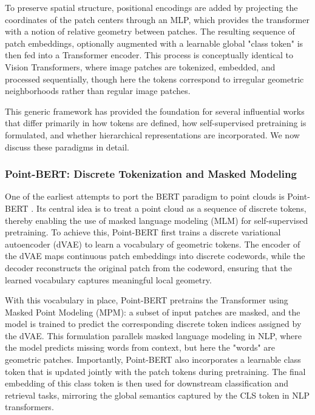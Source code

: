 To preserve spatial structure, positional encodings are added by projecting the coordinates of the patch centers through an MLP, which provides the transformer with a notion of relative geometry between patches. The resulting sequence of patch embeddings, optionally augmented with a learnable global "class token" is then fed into a Transformer encoder. This process is conceptually identical to Vision Transformers, where image patches are tokenized, embedded, and processed sequentially, though here the tokens correspond to irregular geometric neighborhoods rather than regular image patches.

This generic framework has provided the foundation for several influential works that differ primarily in how tokens are defined, how self-supervised pretraining is formulated, and whether hierarchical representations are incorporated. We now discuss these paradigms in detail.

\subsubsection{Point-BERT: Discrete Tokenization and Masked Modeling}
\label{sssec:pointbert}

One of the earliest attempts to port the BERT paradigm to point clouds is Point-BERT \cite{pbert}. Its central idea is to treat a point cloud as a sequence of discrete tokens, thereby enabling the use of masked language modeling (MLM) for self-supervised pretraining. To achieve this, Point-BERT first trains a discrete variational autoencoder (dVAE) to learn a vocabulary of geometric tokens. The encoder of the dVAE maps continuous patch embeddings into discrete codewords, while the decoder reconstructs the original patch from the codeword, ensuring that the learned vocabulary captures meaningful local geometry.

With this vocabulary in place, Point-BERT pretrains the Transformer using Masked Point Modeling (MPM): a subset of input patches are masked, and the model is trained to predict the corresponding discrete token indices assigned by the dVAE. This formulation parallels masked language modeling in NLP, where the model predicts missing words from context, but here the "words" are geometric patches. Importantly, Point-BERT also incorporates a learnable class token that is updated jointly with the patch tokens during pretraining. The final embedding of this class token is then used for downstream classification and retrieval tasks, mirroring the global semantics captured by the CLS token in NLP transformers.

